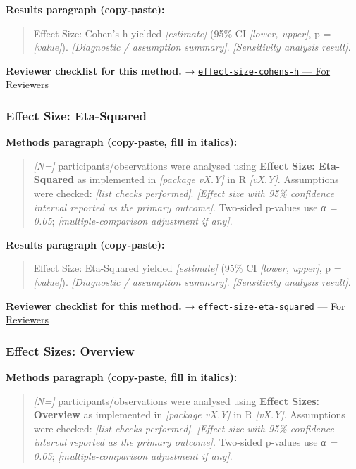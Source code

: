 \documentclass[
]{article}
\begin{document}
\textbf{Results paragraph (copy-paste):}

\begin{quote}
Effect Size: Cohen's h yielded \emph{{[}estimate{]}} (95\% CI
\emph{{[}lower, upper{]}}, p = \emph{{[}value{]}}). \emph{{[}Diagnostic
/ assumption summary{]}}. \emph{{[}Sensitivity analysis result{]}}.
\end{quote}

\textbf{Reviewer checklist for this method.} →
\href{../chapters/05-power/effect-size-cohens-h.Rmd\#for-reviewers}{\texttt{effect-size-cohens-h}
--- For Reviewers}

\subsubsection{Effect Size: Eta-Squared}\label{effect-size-eta-squared}

\textbf{Methods paragraph (copy-paste, fill in italics):}

\begin{quote}
\emph{{[}N={]}} participants/observations were analysed using
\textbf{Effect Size: Eta-Squared} as implemented in \emph{{[}package
vX.Y{]}} in R \emph{{[}vX.Y{]}}. Assumptions were checked: \emph{{[}list
checks performed{]}}. \emph{{[}Effect size with 95\% confidence interval
reported as the primary outcome{]}}. Two-sided p-values use \emph{α =
0.05}; \emph{{[}multiple-comparison adjustment if any{]}}.
\end{quote}

\textbf{Results paragraph (copy-paste):}

\begin{quote}
Effect Size: Eta-Squared yielded \emph{{[}estimate{]}} (95\% CI
\emph{{[}lower, upper{]}}, p = \emph{{[}value{]}}). \emph{{[}Diagnostic
/ assumption summary{]}}. \emph{{[}Sensitivity analysis result{]}}.
\end{quote}

\textbf{Reviewer checklist for this method.} →
\href{../chapters/05-power/effect-size-eta-squared.Rmd\#for-reviewers}{\texttt{effect-size-eta-squared}
--- For Reviewers}

\subsubsection{Effect Sizes: Overview}\label{effect-sizes-overview}

\textbf{Methods paragraph (copy-paste, fill in italics):}

\begin{quote}
\emph{{[}N={]}} participants/observations were analysed using
\textbf{Effect Sizes: Overview} as implemented in \emph{{[}package
vX.Y{]}} in R \emph{{[}vX.Y{]}}. Assumptions were checked: \emph{{[}list
checks performed{]}}. \emph{{[}Effect size with 95\% confidence interval
reported as the primary outcome{]}}. Two-sided p-values use \emph{α =
0.05}; \emph{{[}multiple-comparison adjustment if any{]}}.
\end{quote}
\end{document}
